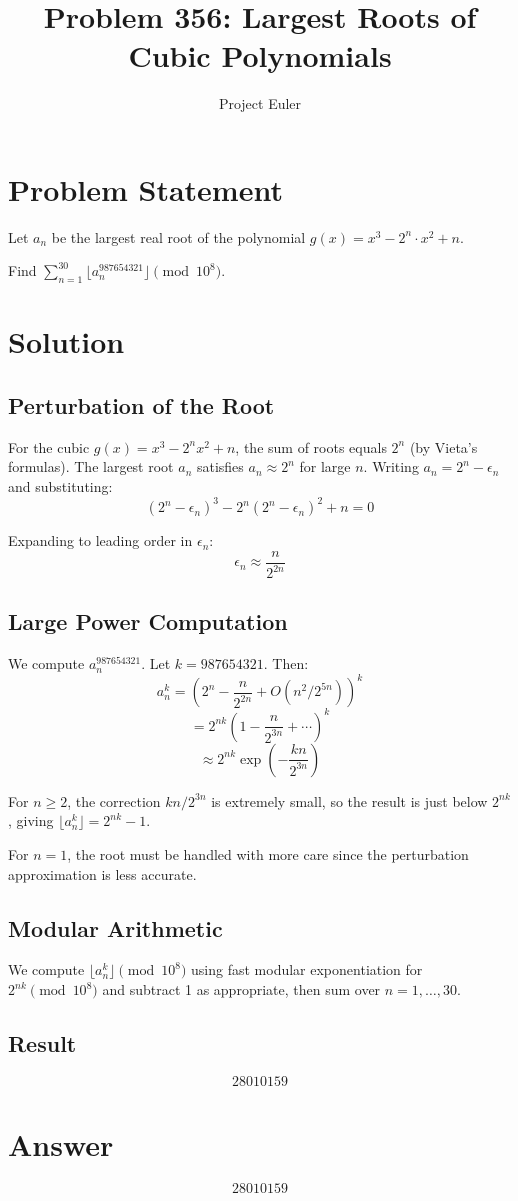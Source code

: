 \documentclass{article}
\title{Problem 356: Largest Roots of Cubic Polynomials}
\author{Project Euler}
\date{}
\begin{document}
\maketitle

\section{Problem Statement}
Let $a_n$ be the largest real root of the polynomial $g(x) = x^3 - 2^n \cdot x^2 + n$.

Find $\displaystyle \sum_{n=1}^{30} \lfloor a_n^{987654321} \rfloor \pmod{10^8}$.

\section{Solution}

\subsection{Perturbation of the Root}
For the cubic $g(x) = x^3 - 2^n x^2 + n$, the sum of roots equals $2^n$ (by Vieta's formulas).
The largest root $a_n$ satisfies $a_n \approx 2^n$ for large $n$. Writing $a_n = 2^n - \epsilon_n$
and substituting:
\[
(2^n - \epsilon_n)^3 - 2^n(2^n - \epsilon_n)^2 + n = 0
\]

Expanding to leading order in $\epsilon_n$:
\[
\epsilon_n \approx \frac{n}{2^{2n}}
\]

\subsection{Large Power Computation}
We compute $a_n^{987654321}$. Let $k = 987654321$. Then:
\[
a_n^k = \left(2^n - \frac{n}{2^{2n}} + O(n^2 / 2^{5n})\right)^k
\]
\[
= 2^{nk}\left(1 - \frac{n}{2^{3n}} + \cdots\right)^k
\]
\[
\approx 2^{nk} \exp\left(-\frac{kn}{2^{3n}}\right)
\]

For $n \geq 2$, the correction $kn/2^{3n}$ is extremely small, so the result is just below
$2^{nk}$, giving $\lfloor a_n^k \rfloor = 2^{nk} - 1$.

For $n = 1$, the root must be handled with more care since the perturbation approximation
is less accurate.

\subsection{Modular Arithmetic}
We compute $\lfloor a_n^k \rfloor \pmod{10^8}$ using fast modular exponentiation for
$2^{nk} \pmod{10^8}$ and subtract 1 as appropriate, then sum over $n = 1, \ldots, 30$.

\subsection{Result}
\[
\boxed{28010159}
\]

\section{Answer}

\[
\boxed{28010159}
\]
\end{document}
